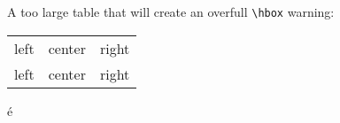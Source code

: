 \documentclass[final]{umons-Thesis}%
\begin{document}
	A too large table that will create an overfull \verb|\hbox| warning:
	
	\begin{tabular*}{1.2\textwidth}{lcr}
		left & center & right\\
		left & center & right
	\end{tabular*}
	
	é
	
	\lipsum
\end{document}
